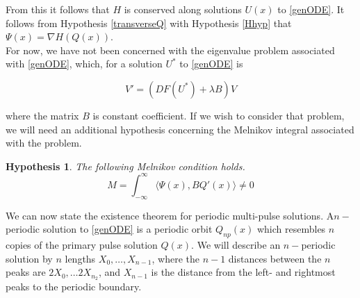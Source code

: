 \documentclass[12pt]{article}
\newtheorem{hypothesis}{Hypothesis}
\begin{document}
From this it follows that $H$ is conserved along solutions $U(x)$ to \eqref{genODE}. It follows from Hypothesis \ref{transverseQ} with Hypothesis \ref{Hhyp} that $\Psi(x) = \nabla H(Q(x))$.\\

For now, we have not been concerned with the eigenvalue problem associated with \eqref{genODE}, which, for a solution $U^*$ to \eqref{genODE} is

\begin{equation}\label{genODEeig}
V' = (DF(U^*) + \lambda B)V
\end{equation}

where the matrix $B$ is constant coefficient. If we wish to consider that problem, we will need an additional hypothesis concerning the Melnikov integral associated with the problem.

\begin{hypothesis}\label{ODEMelnikov}
The following Melnikov condition holds.
\begin{equation}
M = \int_{-\infty}^\infty \langle \Psi(x), B Q'(x) \rangle \neq 0
\end{equation}
\end{hypothesis}

We can now state the existence theorem for periodic multi-pulse solutions. A$n-$periodic solution to \eqref{genODE} is a periodic orbit $Q_{np}(x)$ which resembles $n$ copies of the primary pulse solution $Q(x)$. We will describe an $n-$periodic solution by $n$ lengths $X_0, \dots, X_{n-1}$, where the $n-1$ distances between the $n$ peaks are $2X_0, \dots 2X_{n_2}$, and $X_{n-1}$ is the distance from the left- and rightmost peaks to the periodic boundary.
\end{document}
